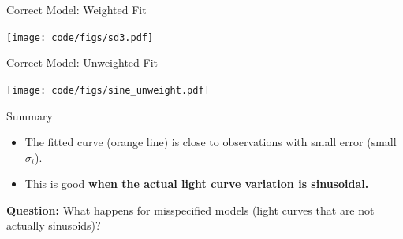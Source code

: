 \documentclass[12pt]{beamer}
\begin{document}

\begin{frame}{Correct Model: Weighted Fit}
\begin{center}
\texttt{[image: code/figs/sd3.pdf]}
\end{center}
\end{frame}

\begin{frame}{Correct Model: Unweighted Fit}
\begin{center}
\texttt{[image: code/figs/sine\_unweight.pdf]}
\end{center}
\end{frame}





\begin{frame}{Summary}
\begin{itemize}
\item The fitted curve (orange line) is close to observations with small  error (small $\sigma_i$).
\item This is good \textbf{when the actual light curve variation is sinusoidal.}
\end{itemize}

\vspace{.2in}
\textbf{Question:} What happens for misspecified models (light curves that are not actually sinusoids)?

\end{frame}




\end{document}
